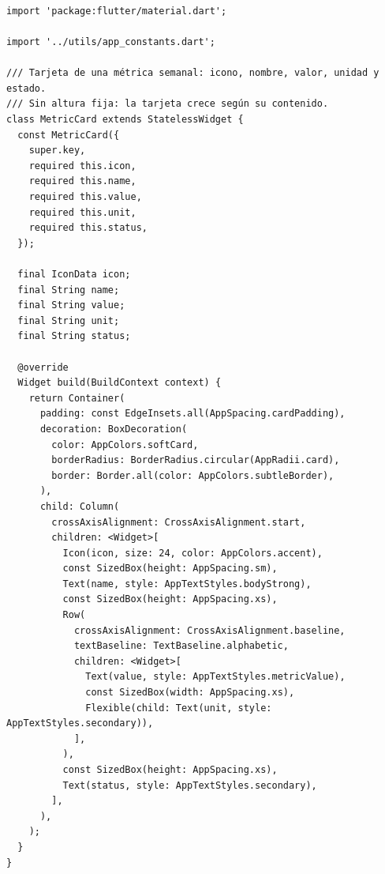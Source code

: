 \documentclass[12pt,a4paper]{article}
\newcommand{\codigo}[1]{\texttt{\detokenize{#1}}}
\begin{document}
\begin{lstlisting}
\end{lstlisting}

\subsubsection*{\codigo{lib/widgets/metric_card.dart}}
\begin{lstlisting}
import 'package:flutter/material.dart';

import '../utils/app_constants.dart';

/// Tarjeta de una métrica semanal: icono, nombre, valor, unidad y estado.
/// Sin altura fija: la tarjeta crece según su contenido.
class MetricCard extends StatelessWidget {
  const MetricCard({
    super.key,
    required this.icon,
    required this.name,
    required this.value,
    required this.unit,
    required this.status,
  });

  final IconData icon;
  final String name;
  final String value;
  final String unit;
  final String status;

  @override
  Widget build(BuildContext context) {
    return Container(
      padding: const EdgeInsets.all(AppSpacing.cardPadding),
      decoration: BoxDecoration(
        color: AppColors.softCard,
        borderRadius: BorderRadius.circular(AppRadii.card),
        border: Border.all(color: AppColors.subtleBorder),
      ),
      child: Column(
        crossAxisAlignment: CrossAxisAlignment.start,
        children: <Widget>[
          Icon(icon, size: 24, color: AppColors.accent),
          const SizedBox(height: AppSpacing.sm),
          Text(name, style: AppTextStyles.bodyStrong),
          const SizedBox(height: AppSpacing.xs),
          Row(
            crossAxisAlignment: CrossAxisAlignment.baseline,
            textBaseline: TextBaseline.alphabetic,
            children: <Widget>[
              Text(value, style: AppTextStyles.metricValue),
              const SizedBox(width: AppSpacing.xs),
              Flexible(child: Text(unit, style: AppTextStyles.secondary)),
            ],
          ),
          const SizedBox(height: AppSpacing.xs),
          Text(status, style: AppTextStyles.secondary),
        ],
      ),
    );
  }
}

\end{lstlisting}
\end{document}
